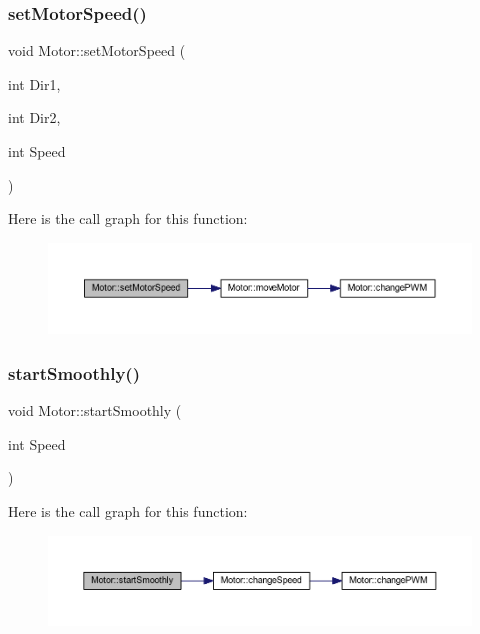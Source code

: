 \subsubsection{\texorpdfstring{set\+Motor\+Speed()}{setMotorSpeed()}\hspace{0.1cm}{\footnotesize\ttfamily [2/2]}}
{\footnotesize\ttfamily void Motor\+::set\+Motor\+Speed (\begin{DoxyParamCaption}\item[{int}]{Dir1,  }\item[{int}]{Dir2,  }\item[{int}]{Speed }\end{DoxyParamCaption})}

Here is the call graph for this function\+:\nopagebreak
\begin{figure}[H]
\begin{center}
\leavevmode
\includegraphics[width=350pt]{class_motor_af6e0f394e5d028bdd8cf9ce5e0fed919_cgraph}
\end{center}
\end{figure}
\mbox{\label{class_motor_aba12da45ff90906b5ad4f2a224d5317d}} 
\subsubsection{\texorpdfstring{start\+Smoothly()}{startSmoothly()}}
{\footnotesize\ttfamily void Motor\+::start\+Smoothly (\begin{DoxyParamCaption}\item[{int}]{Speed }\end{DoxyParamCaption})}

Here is the call graph for this function\+:\nopagebreak
\begin{figure}[H]
\begin{center}
\leavevmode
\includegraphics[width=350pt]{class_motor_aba12da45ff90906b5ad4f2a224d5317d_cgraph}
\end{center}
\end{figure}
\mbox{\label{class_motor_a17eb92ef52d3cb10bc9f6b88b7c34dcc}} 
